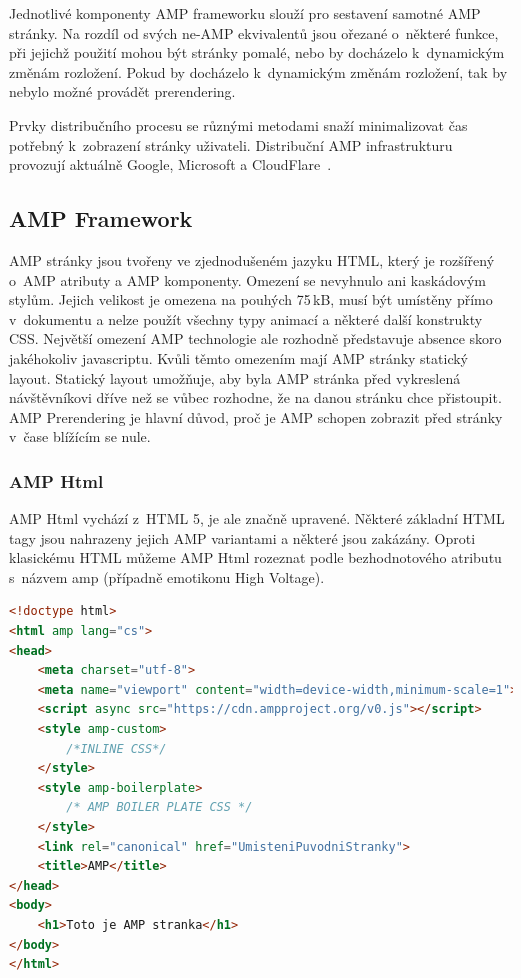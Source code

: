 Jednotlivé komponenty AMP frameworku slouží pro sestavení samotné AMP stránky. Na rozdíl od svých
ne-AMP ekvivalentů jsou ořezané o~některé funkce, při jejichž použití mohou být stránky pomalé, nebo
by docházelo k~dynamickým změnám rozložení. Pokud by docházelo k~dynamickým změnám rozložení,
tak by nebylo možné provádět prerendering.


Prvky distribučního procesu se různými metodami snaží minimalizovat čas potřebný k~zobrazení stránky
uživateli. Distribuční AMP infrastrukturu provozují aktuálně Google, Microsoft a CloudFlare~\cite[Ch.\ 1, p.\ 49]{VzhuruDoAMP}.

\subsection*{AMP Framework}
AMP stránky jsou tvořeny ve zjednodušeném jazyku HTML, který je rozšířený o~AMP atributy a AMP
komponenty. Omezení se nevyhnulo ani kaskádovým stylům. Jejich velikost je omezena na pouhých
75\,kB, musí být umístěny přímo v~dokumentu a nelze použít všechny typy animací a některé další
konstrukty CSS.
Největší omezení AMP technologie ale rozhodně představuje absence skoro jakéhokoliv javascriptu.
Kvůli těmto omezením mají AMP stránky statický layout. Statický layout umožňuje, aby byla AMP stránka před vykreslená návštěvníkovi dříve než se vůbec rozhodne, že na danou stránku chce přistoupit. AMP Prerendering je hlavní důvod, proč je AMP schopen zobrazit před stránky v~čase blížícím se nule\cite{AMP-zero}.
\subsubsection*{AMP Html}
AMP Html vychází z~HTML 5, je ale značně upravené. Některé základní HTML tagy jsou nahrazeny jejich AMP variantami a některé jsou zakázány.
Oproti klasickému HTML můžeme AMP Html rozeznat podle bezhodnotového atributu s~názvem amp (případně emotikonu High Voltage).

\begin{lstlisting}[language=html, caption=Ukázka AMP Html,captionpos=t]
<!doctype html>
<html amp lang="cs">
<head>
    <meta charset="utf-8">
    <meta name="viewport" content="width=device-width,minimum-scale=1">
    <script async src="https://cdn.ampproject.org/v0.js"></script>
    <style amp-custom>
        /*INLINE CSS*/
    </style>
    <style amp-boilerplate>
        /* AMP BOILER PLATE CSS */
    </style>
    <link rel="canonical" href="UmisteniPuvodniStranky">
    <title>AMP</title>
</head>
<body>
    <h1>Toto je AMP stranka</h1>
</body>
</html>

\end{lstlisting}

